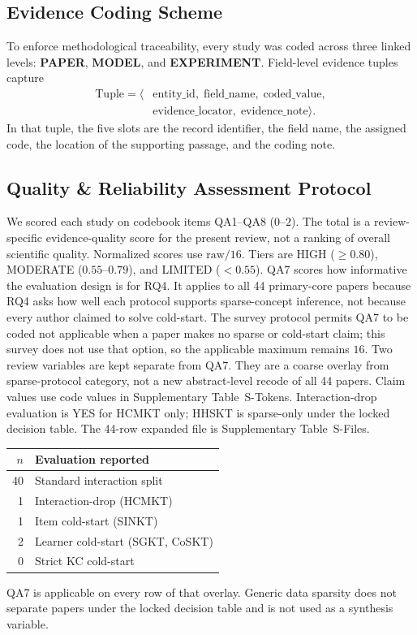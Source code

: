 \documentclass[lettersize,journal]{IEEEtran}
\begin{document}
\subsection{Evidence Coding Scheme}
To enforce methodological traceability, every study was coded across three linked levels: \textbf{PAPER}, \textbf{MODEL}, and \textbf{EXPERIMENT}. Field-level evidence tuples capture
\begin{equation}
\begin{aligned}
\text{Tuple} = \langle &\text{entity\_id},\; \text{field\_name},\; \text{coded\_value},\\
&\text{evidence\_locator},\; \text{evidence\_note} \rangle.
\end{aligned}
\end{equation}
In that tuple, the five slots are the record identifier, the field name, the assigned code, the location of the supporting passage, and the coding note.

\subsection{Quality \& Reliability Assessment Protocol}
We scored each study on codebook items QA1--QA8 ($0$--$2$). The total is a review-specific evidence-quality score for the present review, not a ranking of overall scientific quality. Normalized scores use $\mathrm{raw}/16$. Tiers are HIGH ($\ge 0.80$), MODERATE ($0.55$--$0.79$), and LIMITED ($< 0.55$).
QA7 scores how informative the evaluation design is for RQ4. It applies to all 44 primary-core papers because RQ4 asks how well each protocol supports sparse-concept inference, not because every author claimed to solve cold-start. The survey protocol permits QA7 to be coded not applicable when a paper makes no sparse or cold-start claim; this survey does not use that option, so the applicable maximum remains $16$.
Two review variables are kept separate from QA7. They are a coarse overlay from sparse-protocol category, not a new abstract-level recode of all 44 papers. Claim values use code values in Supplementary Table~S-Tokens. Interaction-drop evaluation is YES for HCMKT only; HHSKT is sparse-only under the locked decision table. The 44-row expanded file is Supplementary Table~S-Files.
\begin{center}
\footnotesize
\begin{tabular}{@{}rl@{}}
\toprule
$n$ & Evaluation reported \\
\midrule
40 & Standard interaction split \\
1 & Interaction-drop (HCMKT) \\
1 & Item cold-start (SINKT) \\
2 & Learner cold-start (SGKT, CoSKT) \\
0 & Strict KC cold-start \\
\bottomrule
\end{tabular}
\end{center}
QA7 is applicable on every row of that overlay. Generic data sparsity does not separate papers under the locked decision table and is not used as a synthesis variable.
\end{document}
